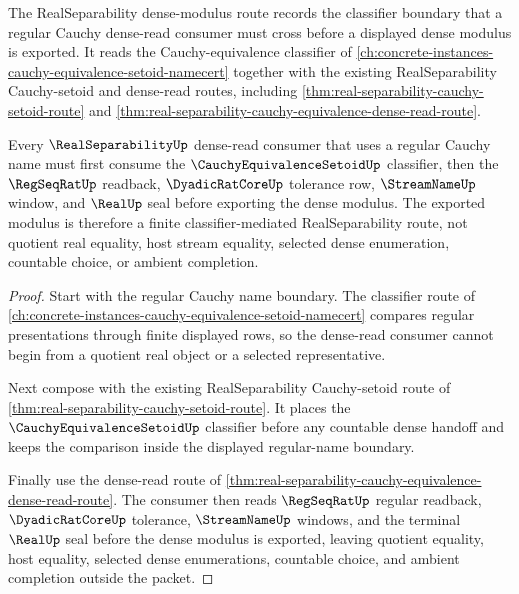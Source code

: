 The RealSeparability dense-modulus route records the classifier boundary that a regular Cauchy dense-read consumer must cross before a displayed dense modulus is exported. It reads the Cauchy-equivalence classifier of \autoref{ch:concrete-instances-cauchy-equivalence-setoid-namecert} together with the existing RealSeparability Cauchy-setoid and dense-read routes, including \autoref{thm:real-separability-cauchy-setoid-route} and \autoref{thm:real-separability-cauchy-equivalence-dense-read-route}.

\begin{theorem}
\label{thm:real-separability-cauchy-setoid-dense-modulus-route}
Every $\RealSeparabilityUp$ dense-read consumer that uses a regular Cauchy name must first consume the $\CauchyEquivalenceSetoidUp$ classifier, then the $\RegSeqRatUp$ readback, $\DyadicRatCoreUp$ tolerance row, $\StreamNameUp$ window, and $\RealUp$ seal before exporting the dense modulus. The exported modulus is therefore a finite classifier-mediated RealSeparability route, not quotient real equality, host stream equality, selected dense enumeration, countable choice, or ambient completion.
\end{theorem}
\begin{proof}
Start with the regular Cauchy name boundary. The classifier route of \autoref{ch:concrete-instances-cauchy-equivalence-setoid-namecert} compares regular presentations through finite displayed rows, so the dense-read consumer cannot begin from a quotient real object or a selected representative.

Next compose with the existing RealSeparability Cauchy-setoid route of \autoref{thm:real-separability-cauchy-setoid-route}. It places the $\CauchyEquivalenceSetoidUp$ classifier before any countable dense handoff and keeps the comparison inside the displayed regular-name boundary.

Finally use the dense-read route of \autoref{thm:real-separability-cauchy-equivalence-dense-read-route}. The consumer then reads $\RegSeqRatUp$ regular readback, $\DyadicRatCoreUp$ tolerance, $\StreamNameUp$ windows, and the terminal $\RealUp$ seal before the dense modulus is exported, leaving quotient equality, host equality, selected dense enumerations, countable choice, and ambient completion outside the packet.
\end{proof}
